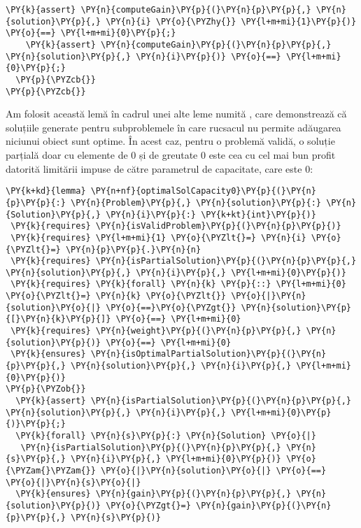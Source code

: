 \begin{sloppypar}
\begin{Verbatim}[commandchars=\\\{\}]
    \PY{k}{assert} \PY{n}{computeGain}\PY{p}{(}\PY{n}{p}\PY{p}{,} \PY{n}{solution}\PY{p}{,} \PY{n}{i} \PY{o}{\PYZhy{}} \PY{l+m+mi}{1}\PY{p}{)} \PY{o}{==} \PY{l+m+mi}{0}\PY{p}{;}
    \PY{k}{assert} \PY{n}{computeGain}\PY{p}{(}\PY{n}{p}\PY{p}{,} \PY{n}{solution}\PY{p}{,} \PY{n}{i}\PY{p}{)} \PY{o}{==} \PY{l+m+mi}{0}\PY{p}{;}
  \PY{p}{\PYZcb{}}
\PY{p}{\PYZcb{}}
\end{Verbatim}
\hspace{4mm} Am folosit această lemă în cadrul unei alte leme numită , care demonstrează că soluțiile generate pentru subproblemele în care rucsacul nu permite adăugarea niciunui obiect sunt optime. În acest caz, pentru o problemă validă, o soluție parțială doar cu elemente de 0 și de greutate 0 este cea cu cel mai bun profit datorită limitării impuse de către parametrul de capacitate, care este 0:
\begin{Verbatim}[commandchars=\\\{\}]
\PY{k+kd}{lemma} \PY{n+nf}{optimalSolCapacity0}\PY{p}{(}\PY{n}{p}\PY{p}{:} \PY{n}{Problem}\PY{p}{,} \PY{n}{solution}\PY{p}{:} \PY{n}{Solution}\PY{p}{,} \PY{n}{i}\PY{p}{:} \PY{k+kt}{int}\PY{p}{)}
 \PY{k}{requires} \PY{n}{isValidProblem}\PY{p}{(}\PY{n}{p}\PY{p}{)}
 \PY{k}{requires} \PY{l+m+mi}{1} \PY{o}{\PYZlt{}=} \PY{n}{i} \PY{o}{\PYZlt{}=} \PY{n}{p}\PY{p}{.}\PY{n}{n}
 \PY{k}{requires} \PY{n}{isPartialSolution}\PY{p}{(}\PY{n}{p}\PY{p}{,} \PY{n}{solution}\PY{p}{,} \PY{n}{i}\PY{p}{,} \PY{l+m+mi}{0}\PY{p}{)}
 \PY{k}{requires} \PY{k}{forall} \PY{n}{k} \PY{p}{::} \PY{l+m+mi}{0} \PY{o}{\PYZlt{}=} \PY{n}{k} \PY{o}{\PYZlt{}} \PY{o}{|}\PY{n}{solution}\PY{o}{|} \PY{o}{==}\PY{o}{\PYZgt{}} \PY{n}{solution}\PY{p}{[}\PY{n}{k}\PY{p}{]} \PY{o}{==} \PY{l+m+mi}{0}
 \PY{k}{requires} \PY{n}{weight}\PY{p}{(}\PY{n}{p}\PY{p}{,} \PY{n}{solution}\PY{p}{)} \PY{o}{==} \PY{l+m+mi}{0}
 \PY{k}{ensures} \PY{n}{isOptimalPartialSolution}\PY{p}{(}\PY{n}{p}\PY{p}{,} \PY{n}{solution}\PY{p}{,} \PY{n}{i}\PY{p}{,} \PY{l+m+mi}{0}\PY{p}{)}
\PY{p}{\PYZob{}}
  \PY{k}{assert} \PY{n}{isPartialSolution}\PY{p}{(}\PY{n}{p}\PY{p}{,} \PY{n}{solution}\PY{p}{,} \PY{n}{i}\PY{p}{,} \PY{l+m+mi}{0}\PY{p}{)}\PY{p}{;}
  \PY{k}{forall} \PY{n}{s}\PY{p}{:} \PY{n}{Solution} \PY{o}{|} 
   \PY{n}{isPartialSolution}\PY{p}{(}\PY{n}{p}\PY{p}{,} \PY{n}{s}\PY{p}{,} \PY{n}{i}\PY{p}{,} \PY{l+m+mi}{0}\PY{p}{)} \PY{o}{\PYZam{}\PYZam{}} \PY{o}{|}\PY{n}{solution}\PY{o}{|} \PY{o}{==} \PY{o}{|}\PY{n}{s}\PY{o}{|}
  \PY{k}{ensures} \PY{n}{gain}\PY{p}{(}\PY{n}{p}\PY{p}{,} \PY{n}{solution}\PY{p}{)} \PY{o}{\PYZgt{}=} \PY{n}{gain}\PY{p}{(}\PY{n}{p}\PY{p}{,} \PY{n}{s}\PY{p}{)}

\end{Verbatim}
\end{sloppypar}
